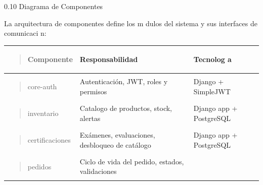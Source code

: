 \documentclass[
]{article}
\newcounter{none} %
\begin{document}
0.10 Diagrama de Componentes

La arquitectura de componentes define los m dulos del sistema y sus
interfaces de comunicaci n:

{\def\LTcaptype{none} %
\begin{longtable}[]{@{}
  >{\raggedright\arraybackslash}p{}
  >{\raggedright\arraybackslash}p{}
  >{\raggedright\arraybackslash}p{}@{}}
\toprule\noalign{}
\begin{minipage}[b]{\linewidth}\raggedright
\begin{quote}
Componente
\end{quote}
\end{minipage} & \begin{minipage}[b]{\linewidth}\raggedright
Responsabilidad
\end{minipage} & \begin{minipage}[b]{\linewidth}\raggedright
Tecnolog a
\end{minipage} \\
\midrule\noalign{}
\endhead
\bottomrule\noalign{}
\endlastfoot
\begin{minipage}[t]{\linewidth}\raggedright
\begin{quote}
core-auth
\end{quote}
\end{minipage} & Autenticación, JWT, roles y permisos & Django +
SimpleJWT \\
\begin{minipage}[t]{\linewidth}\raggedright
\begin{quote}
inventario
\end{quote}
\end{minipage} & Catalogo de productos, stock, alertas & Django app +
PostgreSQL \\
\begin{minipage}[t]{\linewidth}\raggedright
\begin{quote}
certificaciones
\end{quote}
\end{minipage} & Exámenes, evaluaciones, desbloqueo de catálogo & Django
app + PostgreSQL \\
\begin{minipage}[t]{\linewidth}\raggedright
\begin{quote}
pedidos
\end{quote}
\end{minipage} & Ciclo de vida del pedido, estados, validaciones &

\end{longtable}}
\end{document}
